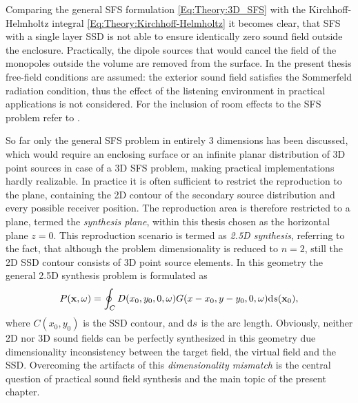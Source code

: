 Comparing the general SFS formulation \eqref{Eq:Theory:3D_SFS} with the Kirchhoff-Helmholtz integral \eqref{Eq:Theory:Kirchhoff-Helmholtz} it becomes clear, that SFS with a single layer SSD is not able to ensure identically zero sound field outside the enclosure. Practically, the dipole sources that would cancel the field of the monopoles outside the volume are removed from the surface.
In the present thesis free-field conditions are assumed: the exterior sound field satisfies the Sommerfeld radiation condition, thus the effect of the listening environment in practical applications is not considered. For the inclusion of room effects to the SFS problem refer to \cite{Spors2005}.
%

\vspace{3mm}
So far only the general SFS problem in entirely 3 dimensions has been discussed, which would require an enclosing surface or an infinite planar distribution of 3D point sources in case of a 3D SFS problem, making practical implementations hardly realizable.
In practice it is often sufficient to restrict the reproduction to the plane, containing the 2D contour of the secondary source distribution and every possible receiver position.
The reproduction area is therefore restricted to a plane, termed the \emph{synthesis plane}, within this thesis chosen as the horizontal plane $z=0$.
This reproduction scenario is termed as \emph{2.5D synthesis}, referring to the fact, that although the problem dimensionality is reduced to $n=2$, still the 2D SSD contour consists of 3D point source elements.
In this geometry the general 2.5D synthesis problem is formulated as
\begin{equation}
P(\mathbf{x},\omega) = \oint_{C} D(x_0,y_0,0,\omega) G(x - x_0, y-y_0, 0 , \omega ) \mathrm{d} s( \mathbf{x}_0 ),
\label{Eq:Theory:25D_SFS}
\end{equation}
where $C(x_0,y_0)$ is the SSD contour, and $\mathrm{d} s$ is the arc length.
Obviously, neither 2D nor 3D sound fields can be perfectly synthesized in this geometry due dimensionality inconsistency between the target field, the virtual field and the SSD.
Overcoming the artifacts of this \emph{dimensionality mismatch} is the central question of practical sound field synthesis and the main topic of the present chapter.

